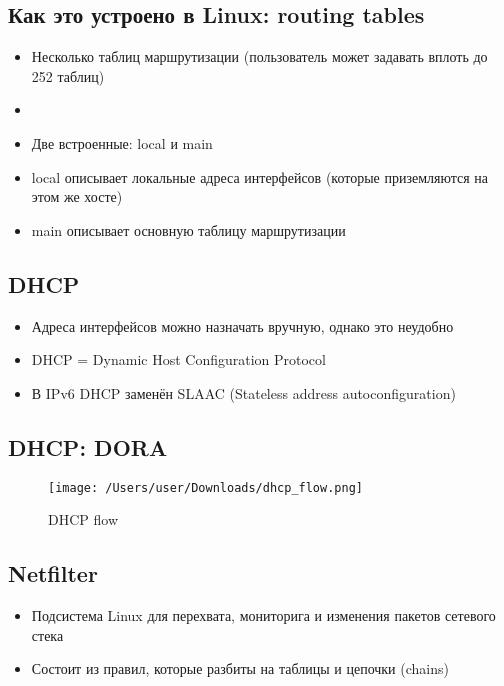   \subsection{Как это устроено в Linux: routing tables}
    \begin{itemize}
      \item Несколько таблиц маршрутизации (пользователь может задавать вплоть до 252 таблиц)
      \item {}
      \item Две встроенные: local и main
      \item local описывает локальные адреса интерфейсов (которые приземляются на этом же хосте)
      \item main описывает основную таблицу маршрутизации 
    \end{itemize}
  
  \subsection{DHCP}
    \begin{itemize}
      \item Адреса интерфейсов можно назначать вручную, однако это неудобно
      \item DHCP = Dynamic Host Configuration Protocol
      \item В IPv6 DHCP заменён SLAAC (Stateless address autoconfiguration)
    \end{itemize}
  
  \subsection{DHCP: DORA}
\begin{figure}[H]
  \centering
  \texttt{[image: /Users/user/Downloads/dhcp\_flow.png]}
  \caption{DHCP flow}
  \label{fig:dhcp}
\end{figure}

  \subsection{Netfilter}
    \begin{itemize}
      \item Подсистема Linux для перехвата, мониторига и изменения пакетов сетевого стека
      \item Состоит из правил, которые разбиты на таблицы и цепочки (chains)
    \end{itemize}
    
